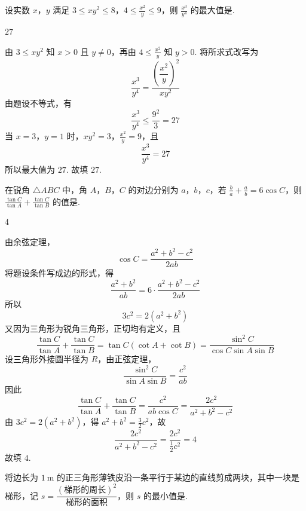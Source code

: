 \begin{problem}
设实数 \(x\)，\(y\) 满足 \(3\leqslant xy^2\leqslant 8\)，\(4\leqslant \frac{x^2}{y}\leqslant 9\)，则 \(\frac{x^3}{y^4}\) 的最大值是\fillinblank{}.
\end{problem}

\begin{answer}
\(27\)
\end{answer}

\begin{solution}
由 \(3\leqslant xy^2\) 知 \(x>0\) 且 \(y\neq0\)，再由 \(4\leqslant\frac{x^2}{y}\) 知 \(y>0\). 将所求式改写为
\[
\frac{x^3}{y^4}=\frac{\left(\dfrac{x^2}{y}\right)^2}{xy^2}
\]
由题设不等式，有
\[
\frac{x^3}{y^4}\leqslant\frac{9^2}{3}=27
\]
当 \(x=3\)，\(y=1\) 时，\(xy^2=3\)，\(\frac{x^2}{y}=9\)，且
\[
\frac{x^3}{y^4}=27
\]
所以最大值为 \(27\). 故填 \(27\).
\end{solution}

\begin{problem}
在锐角 \(\triangle ABC\) 中，角 \(A\)，\(B\)，\(C\) 的对边分别为 \(a\)，\(b\)，\(c\)，若 \(\frac{b}{a}+\frac{a}{b}=6\cos C\)，则 \(\frac{\tan C}{\tan A}+\frac{\tan C}{\tan B}\) 的值是\fillinblank{}.
\end{problem}

\begin{answer}
\(4\)
\end{answer}

\begin{solution}
由余弦定理，
\[
\cos C=\frac{a^2+b^2-c^2}{2ab}
\]
将题设条件写成边的形式，得
\[
\frac{a^2+b^2}{ab}=6\cdot\frac{a^2+b^2-c^2}{2ab}
\]
所以
\[
3c^2=2(a^2+b^2)
\]
又因为三角形为锐角三角形，正切均有定义，且
\[
\frac{\tan C}{\tan A}+\frac{\tan C}{\tan B}=\tan C\left(\cot A+\cot B\right)=\frac{\sin^2C}{\cos C\sin A\sin B}
\]
设三角形外接圆半径为 \(R\)，由正弦定理，
\[
\frac{\sin^2C}{\sin A\sin B}=\frac{c^2}{ab}
\]
因此
\[
\frac{\tan C}{\tan A}+\frac{\tan C}{\tan B}
=\frac{c^2}{ab\cos C}
=\frac{2c^2}{a^2+b^2-c^2}
\]
由 \(3c^2=2(a^2+b^2)\)，得 \(a^2+b^2=\frac32c^2\)，故
\[
\frac{2c^2}{a^2+b^2-c^2}
=\frac{2c^2}{\frac12c^2}=4
\]
故填 \(4\).
\end{solution}

\begin{problem}
将边长为 \(1 \mathrm{~m}\) 的正三角形薄铁皮沿一条平行于某边的直线剪成两块，其中一块是梯形，记 \(s=\dfrac{\left(\text{梯形的周长}\right)^2}{\text{梯形的面积}}\)，则 \(s\) 的最小值是\fillinblank{}.
\end{problem}

